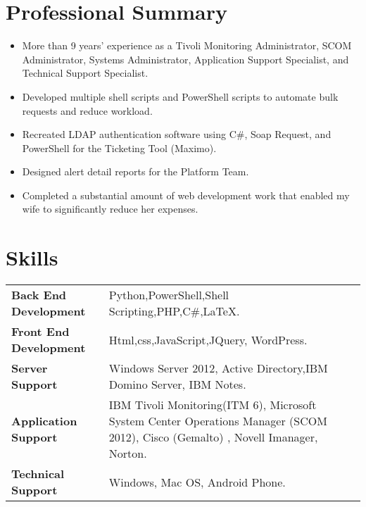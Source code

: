 \documentclass[letterpaper, 12pt]{article}
\begin{document}
	\begin{minipage}[t]{1\textwidth}
		\section*{Professional Summary}
			\begin{itemize}[noitemsep]
				\item {More than 9 years' experience as a Tivoli Monitoring Administrator, SCOM Administrator, Systems Administrator, Application Support Specialist, and Technical Support Specialist.}
				\item {Developed multiple shell scripts and PowerShell scripts to automate bulk requests and reduce workload.}
				\item {Recreated LDAP authentication software using C\#, Soap Request, and PowerShell for the Ticketing Tool (Maximo).}
				\item {Designed alert detail reports for the Platform Team.} 
				\item  {Completed a substantial amount of web development work that enabled my wife to significantly reduce her expenses.}				
			\end{itemize}
			\section*{Skills}
			\begin{tabular}{m{} m{}} 
				\textbf{Back End Development} & Python,PowerShell,Shell Scripting,PHP,C\#,\LaTeX.  \\ 
				\textbf{Front End Development} & Html,css,JavaScript,JQuery, WordPress. \\
				\textbf{Server Support} & Windows Server 2012, Active Directory,IBM Domino Server, IBM Notes. \\
				\textbf{Application Support} & IBM Tivoli Monitoring(ITM 6), Microsoft System Center Operations Manager (SCOM 2012), Cisco (Gemalto) , Novell Imanager, Norton. \\ 
				\textbf{Technical Support} & Windows, Mac OS, Android Phone. \\ 
			\end{tabular}		
	\end{minipage}
\end{document}
